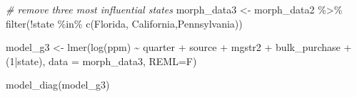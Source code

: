 \documentclass[
  11pt,
]{article}
\newenvironment{Shaded}{\begin{snugshade}}{\end{snugshade}}
\newcommand{\AttributeTok}[1]{\textcolor[rgb]{0.77,0.63,0.00}{#1}}
\newcommand{\CommentTok}[1]{\textcolor[rgb]{0.56,0.35,0.01}{\textit{#1}}}
\newcommand{\DecValTok}[1]{\textcolor[rgb]{0.00,0.00,0.81}{#1}}
\newcommand{\FunctionTok}[1]{\textcolor[rgb]{0.00,0.00,0.00}{#1}}
\newcommand{\NormalTok}[1]{#1}
\newcommand{\OtherTok}[1]{\textcolor[rgb]{0.56,0.35,0.01}{#1}}
\newcommand{\SpecialCharTok}[1]{\textcolor[rgb]{0.00,0.00,0.00}{#1}}
\newcommand{\StringTok}[1]{\textcolor[rgb]{0.31,0.60,0.02}{#1}}
\begin{document}
\begin{Shaded}
\begin{Highlighting}[]
\CommentTok{\# remove three most influential states}
\NormalTok{morph\_data3 }\OtherTok{\textless{}{-}}\NormalTok{ morph\_data2 }\SpecialCharTok{\%\textgreater{}\%}
  \FunctionTok{filter}\NormalTok{(}\SpecialCharTok{!}\NormalTok{state }\SpecialCharTok{\%in\%} \FunctionTok{c}\NormalTok{(}\StringTok{\textquotesingle{}Florida\textquotesingle{}}\NormalTok{, }\StringTok{\textquotesingle{}California\textquotesingle{}}\NormalTok{,}\StringTok{\textquotesingle{}Pennsylvania\textquotesingle{}}\NormalTok{))}


\NormalTok{model\_g3 }\OtherTok{\textless{}{-}} \FunctionTok{lmer}\NormalTok{(}\FunctionTok{log}\NormalTok{(ppm) }\SpecialCharTok{\textasciitilde{}}\NormalTok{  quarter }\SpecialCharTok{+}\NormalTok{ source }\SpecialCharTok{+}\NormalTok{ mgstr2 }\SpecialCharTok{+}\NormalTok{ bulk\_purchase }\SpecialCharTok{+}\NormalTok{ (}\DecValTok{1}\SpecialCharTok{|}\NormalTok{state), }\AttributeTok{data =}\NormalTok{ morph\_data3, }\AttributeTok{REML=}\NormalTok{F)}

\FunctionTok{model\_diag}\NormalTok{(model\_g3)}
\end{Highlighting}
\end{Shaded}
\end{document}
